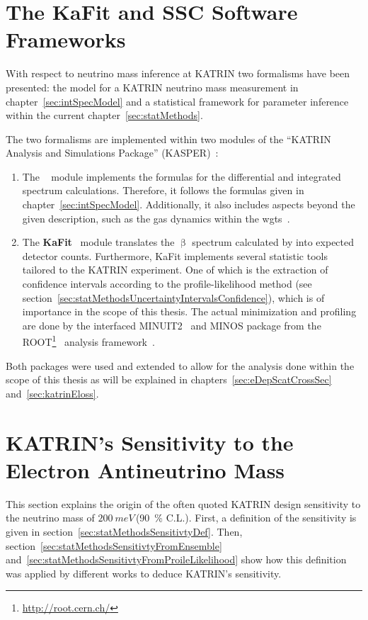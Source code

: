 \section{The KaFit and SSC Software Frameworks}
\label{sec:statMethodsKaFitSSC}
With respect to neutrino mass inference at KATRIN two formalisms have been presented: the model for a KATRIN neutrino mass measurement in chapter~\ref{sec:intSpecModel} and a statistical framework for parameter inference within the current chapter~\ref{sec:statMethods}.

The two formalisms are implemented within two modules of the ``KATRIN Analysis and Simulations Package'' (KASPER)~\cite{Kasper}:\mynobreakpar
\begin{enumerate}
	\item The \textbf{}~\cite{SSC} module implements the formulas for the differential and integrated spectrum calculations. Therefore, it follows the formulas given in chapter~\ref{sec:intSpecModel}. Additionally, it also includes aspects beyond the given description, such as the gas dynamics within the \gls{wgts}~\cite{Hoetzel2012, Groh2015, Kleesiek2019, Kaefer2012}.
	\item The \textbf{KaFit}~\cite{KaFit} module translates the $\upbeta$ spectrum calculated by  into expected detector counts. Furthermore, KaFit implements several statistic tools tailored to the KATRIN experiment. One of which is the extraction of confidence intervals according to the profile-likelihood method (see section~\ref{sec:statMethodsUncertaintyIntervalsConfidence}), which is of importance in the scope of this thesis. The actual minimization and profiling are done by the interfaced MINUIT2~\cite{James1998} and MINOS package from the ROOT\footnote{\url{http://root.cern.ch/}}~\cite{ANTCHEVA2009} analysis framework~\cite{Kleesiek2014}.
\end{enumerate}

Both packages were used and extended to allow for the analysis done within the scope of this thesis as will be explained in chapters~\ref{sec:eDepScatCrossSec} and~\ref{sec:katrinEloss}.

\section{KATRIN's Sensitivity to the Electron Antineutrino Mass}
\label{sec:statMethodsKatrinSensitivity}
This section explains the origin of the often quoted KATRIN design sensitivity to the neutrino mass of $\SI{200}{meV}$\,(\SI{90}{\percent} C.L.). First, a definition of the sensitivity is given in section~\ref{sec:statMethodsSensitivtyDef}. Then, section~\ref{sec:statMethodsSensitivtyFromEnsemble} and~\ref{sec:statMethodsSensitivtyFromProileLikelihood} show how this definition was applied by different works to deduce KATRIN's sensitivity.

